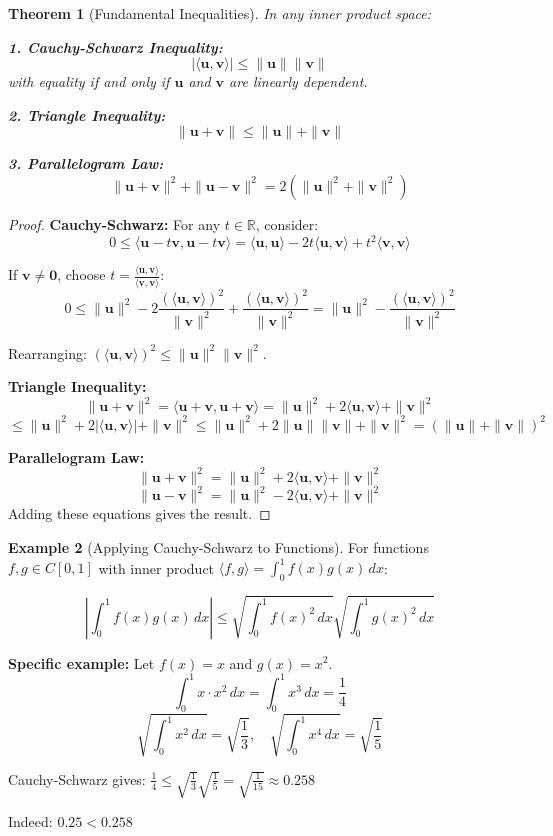 \documentclass[12pt]{article}
\numberwithin{equation}{section}
\newcommand{\vect}[1]{\boldsymbol{#1}}   %
\theoremstyle{plain}
\newtheorem{theorem}{Theorem}[section]
\theoremstyle{definition}
\newtheorem{example}[theorem]{Example}
\theoremstyle{remark}
\begin{document}
\begin{theorem}[Fundamental Inequalities]
In any inner product space:

\textbf{1. Cauchy-Schwarz Inequality:}
$$|\langle \vect{u}, \vect{v} \rangle| \leq \|\vect{u}\| \|\vect{v}\|$$
with equality if and only if $\vect{u}$ and $\vect{v}$ are linearly dependent.

\textbf{2. Triangle Inequality:}
$$\|\vect{u} + \vect{v}\| \leq \|\vect{u}\| + \|\vect{v}\|$$

\textbf{3. Parallelogram Law:}
$$\|\vect{u} + \vect{v}\|^2 + \|\vect{u} - \vect{v}\|^2 = 2(\|\vect{u}\|^2 + \|\vect{v}\|^2)$$
\end{theorem}

\begin{proof}
\textbf{Cauchy-Schwarz:} For any $t \in \mathbb{R}$, consider:
$$0 \leq \langle \vect{u} - t\vect{v}, \vect{u} - t\vect{v} \rangle = \langle \vect{u}, \vect{u} \rangle - 2t\langle \vect{u}, \vect{v} \rangle + t^2\langle \vect{v}, \vect{v} \rangle$$

If $\vect{v} \neq \vect{0}$, choose $t = \frac{\langle \vect{u}, \vect{v} \rangle}{\langle \vect{v}, \vect{v} \rangle}$:
$$0 \leq \|\vect{u}\|^2 - 2\frac{(\langle \vect{u}, \vect{v} \rangle)^2}{\|\vect{v}\|^2} + \frac{(\langle \vect{u}, \vect{v} \rangle)^2}{\|\vect{v}\|^2} = \|\vect{u}\|^2 - \frac{(\langle \vect{u}, \vect{v} \rangle)^2}{\|\vect{v}\|^2}$$

Rearranging: $(\langle \vect{u}, \vect{v} \rangle)^2 \leq \|\vect{u}\|^2 \|\vect{v}\|^2$.

\textbf{Triangle Inequality:}
$$\|\vect{u} + \vect{v}\|^2 = \langle \vect{u} + \vect{v}, \vect{u} + \vect{v} \rangle = \|\vect{u}\|^2 + 2\langle \vect{u}, \vect{v} \rangle + \|\vect{v}\|^2$$
$$\leq \|\vect{u}\|^2 + 2|\langle \vect{u}, \vect{v} \rangle| + \|\vect{v}\|^2 \leq \|\vect{u}\|^2 + 2\|\vect{u}\|\|\vect{v}\| + \|\vect{v}\|^2 = (\|\vect{u}\| + \|\vect{v}\|)^2$$

\textbf{Parallelogram Law:}
$$\|\vect{u} + \vect{v}\|^2 = \|\vect{u}\|^2 + 2\langle \vect{u}, \vect{v} \rangle + \|\vect{v}\|^2$$
$$\|\vect{u} - \vect{v}\|^2 = \|\vect{u}\|^2 - 2\langle \vect{u}, \vect{v} \rangle + \|\vect{v}\|^2$$
Adding these equations gives the result.
\end{proof}

\begin{example}[Applying Cauchy-Schwarz to Functions]
For functions $f, g \in C[0,1]$ with inner product $\langle f, g \rangle = \int_0^1 f(x)g(x) \, dx$:

$$\left|\int_0^1 f(x)g(x) \, dx\right| \leq \sqrt{\int_0^1 f(x)^2 \, dx} \sqrt{\int_0^1 g(x)^2 \, dx}$$

\textbf{Specific example:} Let $f(x) = x$ and $g(x) = x^2$.
$$\int_0^1 x \cdot x^2 \, dx = \int_0^1 x^3 \, dx = \frac{1}{4}$$
$$\sqrt{\int_0^1 x^2 \, dx} = \sqrt{\frac{1}{3}}, \quad \sqrt{\int_0^1 x^4 \, dx} = \sqrt{\frac{1}{5}}$$

Cauchy-Schwarz gives: $\frac{1}{4} \leq \sqrt{\frac{1}{3}} \sqrt{\frac{1}{5}} = \sqrt{\frac{1}{15}} \approx 0.258$

Indeed: $0.25 < 0.258$ \checkmark
\end{example}
\end{document}
